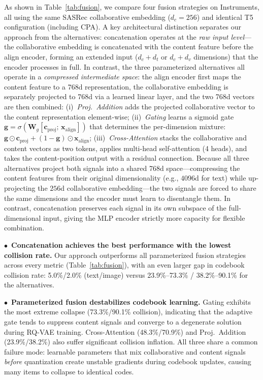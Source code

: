 \documentclass[sigconf, anonymous, review]{acmart}
\begin{document}
As shown in Table~\ref{tab:fusion}, we compare four fusion strategies on Instruments, all using the same SASRec collaborative embedding ($d_c\!=\!256$) and identical T5 configuration (including CPA).
%
A key architectural distinction separates our approach from the alternatives: concatenation operates at the \emph{raw input level}---the collaborative embedding is concatenated with the content feature before the align encoder, forming an extended input ($d_c\!+\!d_t$ or $d_c\!+\!d_v$ dimensions) that the encoder processes in full.
%
In contrast, the three parameterized alternatives all operate in a \emph{compressed intermediate space}: the align encoder first maps the content feature to a 768d representation, the collaborative embedding is separately projected to 768d via a learned linear layer, and the two 768d vectors are then combined:
%
(i)~\emph{Proj.\ Addition} adds the projected collaborative vector to the content representation element-wise;
%
(ii)~\emph{Gating} learns a sigmoid gate $\mathbf{g} = \sigma(\mathbf{W}_g[\mathbf{c}_{\mathrm{proj}};\,\mathbf{x}_{\mathrm{align}}])$ that determines the per-dimension mixture: $\mathbf{g} \odot \mathbf{c}_{\mathrm{proj}} + (1-\mathbf{g}) \odot \mathbf{x}_{\mathrm{align}}$;
%
(iii)~\emph{Cross-Attention} stacks the collaborative and content vectors as two tokens, applies multi-head self-attention (4 heads), and takes the content-position output with a residual connection.
%
Because all three alternatives project both signals into a shared 768d space---compressing the content features from their original dimensionality (e.g., $4096$d for text) while up-projecting the $256$d collaborative embedding---the two signals are forced to share the same dimensions and the encoder must learn to disentangle them.
%
In contrast, concatenation preserves each signal in its own subspace of the full-dimensional input, giving the MLP encoder strictly more capacity for flexible combination.

\noindent$\bullet$~\textbf{Concatenation achieves the best performance with the lowest collision rate.}
%
Our approach outperforms all parameterized fusion strategies across every metric (Table~\ref{tab:fusion}), with an even larger gap in codebook collision rate: 5.0\%/2.0\% (text/image) versus 23.9\%--73.3\% / 38.2\%--90.1\% for the alternatives.

\noindent$\bullet$~\textbf{Parameterized fusion destabilizes codebook learning.}
%
Gating exhibits the most extreme collapse (73.3\%/90.1\% collision), indicating that the adaptive gate tends to suppress content signals and converge to a degenerate solution during RQ-VAE training.
%
Cross-Attention (48.3\%/70.9\%) and Proj.\ Addition (23.9\%/38.2\%) also suffer significant collision inflation.
%
All three share a common failure mode: learnable parameters that mix collaborative and content signals \emph{before} quantization create unstable gradients during codebook updates, causing many items to collapse to identical codes.
\end{document}
